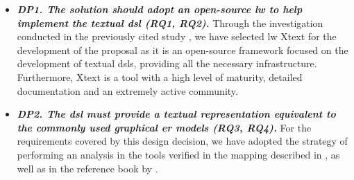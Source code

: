 \begin{itemize}
    \item\textit{\textbf{DP1. The solution should adopt an open-source \ac{lw} to help implement the textual \ac{dsl} (RQ1, RQ2).}}
     Through the investigation conducted in the previously cited study \cite{Lopes:2019}, we have selected \ac{lw} Xtext for the development of the proposal as it is an open-source framework focused on the development of textual \acp{dsl}, providing all the necessary infrastructure.
     Furthermore, Xtext is a tool with a high level of maturity, detailed documentation and an extremely active community.
    
    \item\textit{\textbf{DP2. The \ac{dsl} must provide a textual representation equivalent to the commonly used graphical \ac{er} models (RQ3, RQ4).}}
    For the requirements covered by this design decision, we have adopted the strategy of performing an analysis in the tools verified in the mapping described in \cite{Lopes:2019}, as well as in the reference book by \cite{Heuser:2009}.
    

\end{itemize}
